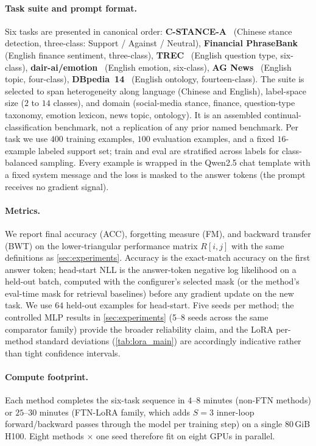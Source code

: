 \documentclass{article}
\begin{document}
\paragraph{Task suite and prompt format.}
Six tasks are presented in canonical order: \textbf{C-STANCE-A}~\citep{zhao2024cstance} (Chinese stance detection, three-class: Support / Against / Neutral), \textbf{Financial PhraseBank}~\citep{malo2014finphrasebank} (English finance sentiment, three-class), \textbf{TREC}~\citep{li2002trec} (English question type, six-class), \textbf{dair-ai/emotion}~\citep{saravia2018emotion} (English emotion, six-class), \textbf{AG News}~\citep{zhang2015charcnn} (English topic, four-class), \textbf{DBpedia~14}~\citep{zhang2015charcnn} (English ontology, fourteen-class). The suite is selected to span heterogeneity along language (Chinese and English), label-space size ($2$ to $14$ classes), and domain (social-media stance, finance, question-type taxonomy, emotion lexicon, news topic, ontology). It is an assembled continual-classification benchmark, not a replication of any prior named benchmark. Per task we use $400$ training examples, $100$ evaluation examples, and a fixed $16$-example labeled support set; train and eval are stratified across labels for class-balanced sampling. Every example is wrapped in the Qwen2.5 chat template with a fixed system message and the loss is masked to the answer tokens (the prompt receives no gradient signal).

\paragraph{Metrics.}
We report final accuracy (ACC), forgetting measure (FM), and backward transfer (BWT) on the lower-triangular performance matrix $R[i,j]$ with the same definitions as \cref{sec:experiments}. Accuracy is the exact-match accuracy on the first answer token; head-start NLL is the answer-token negative log likelihood on a held-out batch, computed with the configurer's selected mask (or the method's eval-time mask for retrieval baselines) before any gradient update on the new task. We use $64$ held-out examples for head-start. Five seeds per method; the controlled MLP results in \cref{sec:experiments} (5--8 seeds across the same comparator family) provide the broader reliability claim, and the LoRA per-method standard deviations (\cref{tab:lora_main}) are accordingly indicative rather than tight confidence intervals.

\paragraph{Compute footprint.}
Each method completes the six-task sequence in $4$--$8$ minutes (non-FTN methods) or $25$--$30$ minutes (FTN-LoRA family, which adds $S=3$ inner-loop forward/backward passes through the model per training step) on a single 80\,GiB H100. Eight methods $\times$ one seed therefore fit on eight GPUs in parallel.
\end{document}
